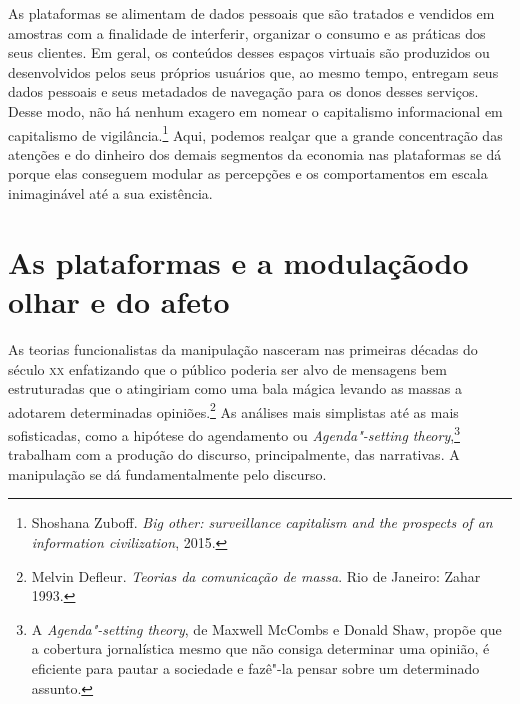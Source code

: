 As plataformas se alimentam de dados pessoais que são tratados e
vendidos em amostras com a finalidade de interferir, organizar o consumo
e as práticas dos seus clientes. Em geral, os conteúdos desses espaços
virtuais são produzidos ou desenvolvidos pelos seus próprios usuários
que, ao mesmo tempo, entregam seus dados pessoais e seus metadados de
navegação para os donos desses serviços. Desse modo, não há nenhum
exagero em nomear o capitalismo informacional em capitalismo de
vigilância.\footnote{Shoshana Zuboff. \emph{Big other: surveillance capitalism and the
prospects of an information civilization}, 2015.} Aqui, podemos realçar que a grande
concentração das atenções e do dinheiro dos demais segmentos da economia
nas plataformas se dá porque elas conseguem modular as percepções e os
comportamentos em escala inimaginável até a sua existência.

\section{As plataformas e a modulação\break do olhar e do afeto}

As teorias funcionalistas da manipulação nasceram nas primeiras décadas
do século \textsc{xx} enfatizando que o público poderia ser alvo de mensagens bem
estruturadas que o atingiriam como uma bala mágica levando as massas a
adotarem determinadas opiniões.\footnote{Melvin Defleur. \emph{Teorias da comunicação de massa}. Rio de Janeiro: Zahar 1993.} As análises mais
simplistas até as mais sofisticadas, como a hipótese do agendamento ou
\emph{Agenda"-setting theory},\footnote{A \emph{Agenda"-setting theory}, de
  Maxwell McCombs e Donald Shaw, propõe que a cobertura jornalística
  mesmo que não consiga determinar uma opinião, é eficiente para pautar a
  sociedade e fazê"-la pensar sobre um determinado assunto.} trabalham com a produção do discurso, principalmente, das narrativas. A manipulação se dá
fundamentalmente pelo discurso.


